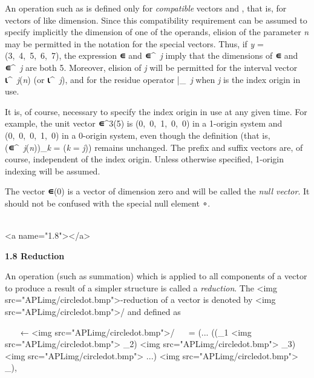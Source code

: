 \par An operation such as  \wedge {} is defined only for \textit{compatible} vectors 
 and , that is, for vectors of like dimension. Since this compatibility requirement can be assumed to specify implicitly the dimension of one of the operands, elision of the parameter \textit{n} may be permitted in the notation for the special vectors. Thus, if \textit{y} = (3,\ 4,\ 5,\ 6,\ 7), the expression \textbf{∊} \times {} and \textbf{∊}^{\textit{\ j}} \times {} imply that the dimensions of \textbf{∊} and \textbf{∊}^{\textit{\ j}} are both 5. Moreover, elision of \textit{j} will be permitted for the interval vector 
\textbf{⍳}^{\textit{\ j}}(\textit{n}) (or \textbf{⍳}^{\textit{\ j}}), and for the residue operator |_{\textit{\ j}} when \textit{j} is the index origin in use.

\par It is, of course, necessary to specify the index origin in use at any given time. For example, the unit vector 
\textbf{∊}^{3}(5) is (0,\ 0,\ 1,\ 0,\ 0) in a 1-origin system and (0,\ 0,\ 0,\ 1,\ 0) in a 0-origin system, even though the definition (that is, (\textbf{∊}^{\textit{\ j}}(\textit{n}))_{\textit{k}} = (\textit{k} = \textit{j})) remains unchanged. The prefix and suffix vectors are, of course, independent of the index origin. Unless otherwise specified, 1-origin indexing will be assumed.

\par The vector \textbf{∊}(0) is a vector of dimension zero and will be called the \textit{null vector}. It should not be confused with the special null element ∘.
\\\ 



<a name="1.8"></a>
\par \textbf{1.8 Reduction}

\par An operation (such as summation) which is applied to all components of a vector to produce a result of a simpler structure is called a \textit{reduction}. The <img src="APLimg/circledot.bmp">-reduction of a vector  is denoted by
<img src="APLimg/circledot.bmp">/ and defined as

\par \ \ \  ← 
<img src="APLimg/circledot.bmp">/ \ \leftrightarrow\  = (... ((_{1}
<img src="APLimg/circledot.bmp"> _{2})
<img src="APLimg/circledot.bmp"> _{3})
<img src="APLimg/circledot.bmp"> ...) 
<img src="APLimg/circledot.bmp"> _{\textit{\nu}}),

